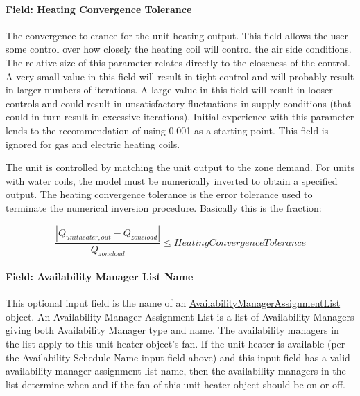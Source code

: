 \paragraph{Field: Heating Convergence Tolerance}\label{field-heating-convergence-tolerance-2}

The convergence tolerance for the unit heating output. This field allows the user some control over how closely the heating coil will control the air side conditions. The relative size of this parameter relates directly to the closeness of the control. A very small value in this field will result in tight control and will probably result in larger numbers of iterations. A large value in this field will result in looser controls and could result in unsatisfactory fluctuations in supply conditions (that could in turn result in excessive iterations). Initial experience with this parameter lends to the recommendation of using 0.001 as a starting point. This field is ignored for gas and electric heating coils.

The unit is controlled by matching the unit output to the zone demand. For units with water coils, the model must be numerically inverted to obtain a specified output. The heating convergence tolerance is the error tolerance used to terminate the numerical inversion procedure. Basically this is the fraction:

\begin{equation}
\frac{{\left| {{Q_{unit heater,out}} - {Q_{zoneload}}} \right|}}{{{Q_{zoneload}}}} \le HeatingConvergenceTolerance
\end{equation}

\paragraph{Field: Availability Manager List Name}\label{field-availability-manager-list-name-2}

This optional input field is the name of an \hyperref[availabilitymanagerassignmentlist]{AvailabilityManagerAssignmentList} object. An Availability Manager Assignment List is a list of Availability Managers giving both Availability Manager type and name. The availability managers in the list apply to this unit heater object's fan. If the unit heater is available (per the Availability Schedule Name input field above) and this input field has a valid availability manager assignment list name, then the availability managers in the list determine when and if the fan of this unit heater object should be on or off.

